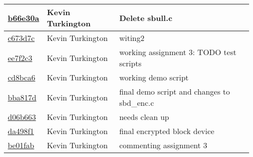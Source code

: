 \begin{tabular}{l l l}
\href{https://github.com/zainkai/CS444/commit/b66e30aaacb44adfdafd5f42072b02564d0b85bf}{b66e30a} & Kevin Turkington & Delete sbull.c\\\hline
\href{https://github.com/zainkai/CS444/commit/c673d7cffe2349e65283926258e9b5e2430085b7}{c673d7c} & Kevin Turkington & witing2\\\hline
\href{https://github.com/zainkai/CS444/commit/ee7f2c30e067caac8a22cd40d2ac9e5008bf85e5}{ee7f2c3} & Kevin Turkington & working assignment 3: TODO test scripts\\\hline
\href{https://github.com/zainkai/CS444/commit/cd8bca6f4c1a6861aff0cd455d7a6c8b67b6c93e}{cd8bca6} & Kevin Turkington & working demo script\\\hline
\href{https://github.com/zainkai/CS444/commit/bba817d068f9edf9c53c8a6a08b25febd3a75465}{bba817d} & Kevin Turkington & final demo script and changes to sbd\_enc.c\\\hline
\href{https://github.com/zainkai/CS444/commit/d06b6630f770f673ee7b6844cd91ebd822616c10}{d06b663} & Kevin Turkington & needs clean up\\\hline
\href{https://github.com/zainkai/CS444/commit/da498f1ced13645421a54f0d1f681cd8b913370a}{da498f1} & Kevin Turkington & final encrypted block device\\\hline
\href{https://github.com/zainkai/CS444/commit/be01fab38b8bcac8342ec11d1c88a0f6f65820a2}{be01fab} & Kevin Turkington & commenting assignment 3\\\hline\end{tabular}
